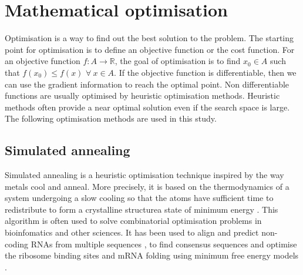 \section{Mathematical optimisation}
Optimisation is a way to find out the best solution to the problem. The starting point for optimisation is to define an objective function or the cost function. For an objective function $f: A \rightarrow  \mathbb{R}$, the goal of optimisation is to find $x_0 \in A$ such that $f(x_0) \leq f(x)$ $\forall\ x \in A$. If the objective function is differentiable, then we can use the gradient information to reach the optimal point. Non differentiable functions are usually optimised by heuristic optimisation methods. Heuristic methods often provide a near optimal solution even if the search space is large. The following optimisation methods are used in this study.


\subsection{Simulated annealing}
\label{subsection:sim_anneal}
Simulated annealing is a heuristic optimisation technique inspired by the way metals cool and anneal. More precisely, it is based on the thermodynamics of a system undergoing a slow cooling so that the atoms have sufficient time to redistribute to form a crystalline structure\textemdash a state of minimum energy  \cite{Kirkpatrick1983-hh, Ingber2000-aw, Keith2002-jx, Brownlee2011-bk, presse1988numerical}. This algorithm is often used to solve combinatorial optimisation problems in bioinfomatics and other sciences. It has been used to align and predict non-coding RNAs from multiple sequences \cite{Lindgreen2007-jy}, to find consensus sequences \cite{Keith2002-jx} and optimise the ribosome binding sites \cite{Salis2009-dh} and mRNA folding using minimum free energy models \cite{Gaspar2013-bg}.

